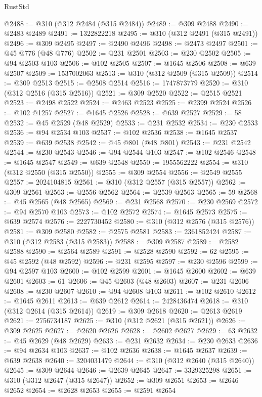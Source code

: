 \begin{lexlean}{RustStd}
\begin{coremodule}
{\begin{coremodule}
{{{{{{{{{{{{{{{{{{{{{{{{{{{{{{{{{{{{{@2488 := @310 (@312 @2484 (@315 @2484))
@2489 := @309 @2488
@2490 := @2483 @2489
@2491 := 1322822218
@2495 := @310 (@312 @2491 (@315 @2491))
@2496 := @309 @2495
@2497 := @2490 @2496
@2498 := @2473 @2497
@2501 := @45 @776 (@48 @776)
@2502 := @231 @2501
@2503 := @230 @2502
@2505 := @94 @2503 @103
@2506 := @102 @2505
@2507 := @1645 @2506
@2508 := @639 @2507
@2509 := 1537002063
@2513 := @310 (@312 @2509 (@315 @2509))
@2514 := @309 @2513
@2515 := @2508 @2514
@2516 := 1747873779
@2520 := @310 (@312 @2516 (@315 @2516))
@2521 := @309 @2520
@2522 := @2515 @2521
@2523 := @2498 @2522
@2524 := @2463 @2523
@2525 := @2399 @2524
@2526 := @102 @1257
@2527 := @1645 @2526
@2528 := @639 @2527
@2529 := 58
@2532 := @45 @2529 (@48 @2529)
@2533 := @231 @2532
@2534 := @230 @2533
@2536 := @94 @2534 @103
@2537 := @102 @2536
@2538 := @1645 @2537
@2539 := @639 @2538
@2542 := @45 @801 (@48 @801)
@2543 := @231 @2542
@2544 := @230 @2543
@2546 := @94 @2544 @103
@2547 := @102 @2546
@2548 := @1645 @2547
@2549 := @639 @2548
@2550 := 1955562222
@2554 := @310 (@312 @2550 (@315 @2550))
@2555 := @309 @2554
@2556 := @2549 @2555
@2557 := 2024104815
@2561 := @310 (@312 @2557 (@315 @2557))
@2562 := @309 @2561
@2563 := @2556 @2562
@2564 := @2539 @2563
@2565 := 59
@2568 := @45 @2565 (@48 @2565)
@2569 := @231 @2568
@2570 := @230 @2569
@2572 := @94 @2570 @103
@2573 := @102 @2572
@2574 := @1645 @2573
@2575 := @639 @2574
@2576 := 2227730452
@2580 := @310 (@312 @2576 (@315 @2576))
@2581 := @309 @2580
@2582 := @2575 @2581
@2583 := 2361852424
@2587 := @310 (@312 @2583 (@315 @2583))
@2588 := @309 @2587
@2589 := @2582 @2588
@2590 := @2564 @2589
@2591 := @2528 @2590
@2592 := 62
@2595 := @45 @2592 (@48 @2592)
@2596 := @231 @2595
@2597 := @230 @2596
@2599 := @94 @2597 @103
@2600 := @102 @2599
@2601 := @1645 @2600
@2602 := @639 @2601
@2603 := 61
@2606 := @45 @2603 (@48 @2603)
@2607 := @231 @2606
@2608 := @230 @2607
@2610 := @94 @2608 @103
@2611 := @102 @2610
@2612 := @1645 @2611
@2613 := @639 @2612
@2614 := 2428436474
@2618 := @310 (@312 @2614 (@315 @2614))
@2619 := @309 @2618
@2620 := @2613 @2619
@2621 := 2756734187
@2625 := @310 (@312 @2621 (@315 @2621))
@2626 := @309 @2625
@2627 := @2620 @2626
@2628 := @2602 @2627
@2629 := 63
@2632 := @45 @2629 (@48 @2629)
@2633 := @231 @2632
@2634 := @230 @2633
@2636 := @94 @2634 @103
@2637 := @102 @2636
@2638 := @1645 @2637
@2639 := @639 @2638
@2640 := 3204031479
@2644 := @310 (@312 @2640 (@315 @2640))
@2645 := @309 @2644
@2646 := @2639 @2645
@2647 := 3329325298
@2651 := @310 (@312 @2647 (@315 @2647))
@2652 := @309 @2651
@2653 := @2646 @2652
@2654 := @2628 @2653
@2655 := @2591 @2654
}}}}}}}}}}}}}}}}}}}}}}}}}}}}}}}}}}}}}
\end{coremodule}}
\end{coremodule}
\end{lexlean}
